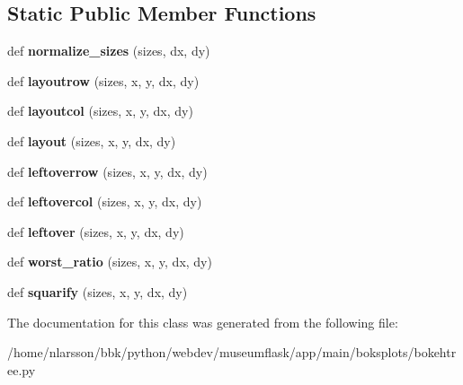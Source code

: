 \subsection*{Static Public Member Functions}
\begin{DoxyCompactItemize}
\item 
\mbox{\label{classapp_1_1main_1_1boksplots_1_1bokehtree_1_1BokehTree_a53243afa451cf8232cdaecb9f50798bc}} 
def {\bfseries normalize\+\_\+sizes} (sizes, dx, dy)
\item 
\mbox{\label{classapp_1_1main_1_1boksplots_1_1bokehtree_1_1BokehTree_a3a4378f9e33b16450c274d1b1ab64829}} 
def {\bfseries layoutrow} (sizes, x, y, dx, dy)
\item 
\mbox{\label{classapp_1_1main_1_1boksplots_1_1bokehtree_1_1BokehTree_ae88941c6f46748ab7c1073ae2aa43fe9}} 
def {\bfseries layoutcol} (sizes, x, y, dx, dy)
\item 
\mbox{\label{classapp_1_1main_1_1boksplots_1_1bokehtree_1_1BokehTree_a6923d77522db5d51eea89bd4cb810e52}} 
def {\bfseries layout} (sizes, x, y, dx, dy)
\item 
\mbox{\label{classapp_1_1main_1_1boksplots_1_1bokehtree_1_1BokehTree_a7fb95025422bc35b8790bf221da4a2c9}} 
def {\bfseries leftoverrow} (sizes, x, y, dx, dy)
\item 
\mbox{\label{classapp_1_1main_1_1boksplots_1_1bokehtree_1_1BokehTree_ad3de5752f26e2349af3322a972a23287}} 
def {\bfseries leftovercol} (sizes, x, y, dx, dy)
\item 
\mbox{\label{classapp_1_1main_1_1boksplots_1_1bokehtree_1_1BokehTree_a8ff1f3a4f7c53b8e79bb3c43ee04dcfd}} 
def {\bfseries leftover} (sizes, x, y, dx, dy)
\item 
\mbox{\label{classapp_1_1main_1_1boksplots_1_1bokehtree_1_1BokehTree_a9fe84211a581b86dd1e97f122d69d20c}} 
def {\bfseries worst\+\_\+ratio} (sizes, x, y, dx, dy)
\item 
\mbox{\label{classapp_1_1main_1_1boksplots_1_1bokehtree_1_1BokehTree_a221ca3a41008df559308598a4ec2bcd0}} 
def {\bfseries squarify} (sizes, x, y, dx, dy)
\end{DoxyCompactItemize}


The documentation for this class was generated from the following file\+:\begin{DoxyCompactItemize}
\item 
/home/nlarsson/bbk/python/webdev/museumflask/app/main/boksplots/bokehtree.\+py\end{DoxyCompactItemize}
